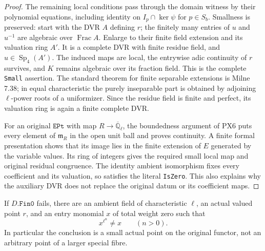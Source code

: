 \begin{proof}
The remaining local conditions pass through the domain
witness by their polynomial equations, including identity
on $I_p\cap\ker\psi$ for $p\in S_b$.
Smallness is preserved: start with the DVR $A$ defining $r$;
the finitely many entries of $u$ and $u^{-1}$ are algebraic
over $\operatorname{Frac}A$.  Enlarge to their finite field
extension and its valuation ring $A'$.  It is a complete
DVR with finite residue field, and $u\in\operatorname{Sp}_4(A')$.
The induced maps are local, the entrywise adic continuity
of $r$ survives, and $K$ remains algebraic over its fraction
field.  This is the complete \texttt{Small} assertion.
The standard theorem for finite separable extensions is
Milne 7.38; in equal characteristic the purely inseparable
part is obtained by adjoining $\ell$-power roots of a
uniformizer.  Since the residue field is finite and perfect,
its valuation ring is again a finite complete DVR.

For an original $\texttt{EPt}$ with map $R\to
\overline{\mathbb Q}_\ell$, the boundedness argument of PX6
puts every element of $\mathfrak m_R$ in the open unit ball
and proves continuity.  A finite formal presentation shows
that its image lies in the finite extension of $E$ generated
by the variable values.  Its ring of integers gives the
required small local map and original residual congruence.
The identity ambient isomorphism fixes every coefficient
and its valuation, so satisfies the literal \texttt{IsZero}.
This also explains why the auxiliary DVR does not replace
the original datum or its coefficient maps.
\end{proof}

\begin{proposition}
\label{claim:IX3}
If $D.\texttt{Fin0}$ fails, there are an ambient field of
characteristic $\ell$, an actual valued point $r$, and an
entry monomial $x$ of total weight zero such that
\[
                   x^{\ell^n}\ne x\qquad(n>0).
 \tag{IX.5}
\]
In particular the conclusion is a small actual point on the
original functor, not an arbitrary point of a larger special
fibre.
\end{proposition}

